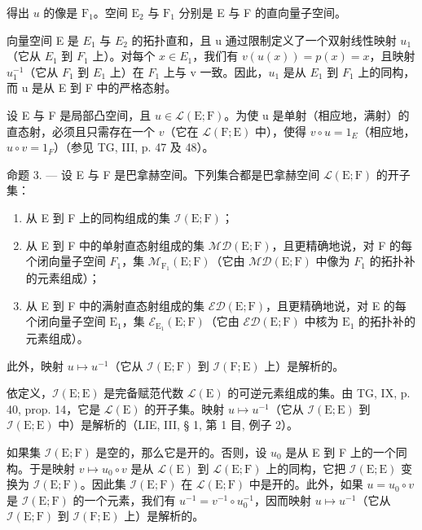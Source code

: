 得出 \(u\) 的像是 \(\mathrm{F}_{1}\)。空间 \(\mathrm{E}_{2}\) 与 \(\mathrm{F}_{1}\) 分别是 E 与 F 的直向量子空间。

向量空间 E 是 \(E_{1}\) 与 \(E_{2}\) 的拓扑直和，且 u 通过限制定义了一个双射线性映射 \(u_{1}\)（它从 \(E_{1}\) 到 \(F_{1}\) 上）。对每个 \(x \in E_{1}\)，我们有 \(v(u(x)) = p(x) = x\)，且映射 \(u_{1}^{-1}\)（它从 \(F_{1}\) 到 \(E_{1}\) 上）在 \(F_{1}\) 上与 v 一致。因此，\(u_{1}\) 是从 \(E_{1}\) 到 \(F_{1}\) 上的同构，而 u 是从 E 到 F 中的严格态射。

设 E 与 F 是局部凸空间，且 \(u \in \mathcal{L}(\mathrm{E};\mathrm{F})\)。为使 u 是单射（相应地，满射）的直态射，必须且只需存在一个 \(v\)（它在 \(\mathcal{L}(\mathrm{F};\mathrm{E})\) 中），使得 \(v \circ u = 1_{E}\)（相应地，\(u \circ v = 1_{F}\)）（参见 TG, III, p. 47 及 48）。

命题 3. --- 设 E 与 F 是巴拿赫空间。下列集合都是巴拿赫空间 \(\mathcal{L}(\mathrm{E};\mathrm{F})\) 的开子集：

\begin{enumerate}
\def\labelenumi{\alph{enumi})}
\item
  从 E 到 F 上的同构组成的集 \(\mathcal{I}(\mathrm{E};\mathrm{F})\)；
\item
   从 E 到 F 中的单射直态射组成的集 \(\mathcal{M}\mathcal{D}(\mathrm{E};\mathrm{F})\)，且更精确地说，对 F 的每个闭向量子空间 \(F_{1}\)，集 \(\mathcal{M}_{\mathrm{F}_{1}}(\mathrm{E};\mathrm{F})\)（它由 \(\mathcal{M}\mathcal{D}(\mathrm{E};\mathrm{F})\) 中像为 \(F_{1}\) 的拓扑补的元素组成）；
\item
   从 E 到 F 中的满射直态射组成的集 \(\mathcal{E}\mathcal{D}(\mathrm{E};\mathrm{F})\)，且更精确地说，对 E 的每个闭向量子空间 \(\mathrm{E}_1\)，集 \(\mathcal{E}_{\mathrm{E}_1}(\mathrm{E};\mathrm{F})\)（它由 \(\mathcal{E}\mathcal{D}(\mathrm{E};\mathrm{F})\) 中核为 \(\mathrm{E}_1\) 的拓扑补的元素组成）。
\end{enumerate}

此外，映射 \(u \mapsto u^{-1}\)（它从 \(\mathcal{I}(\mathrm{E};\mathrm{F})\) 到 \(\mathcal{I}(\mathrm{F};\mathrm{E})\) 上）是解析的。

依定义，\(\mathcal{I}(\mathrm{E};\mathrm{E})\) 是完备赋范代数 \(\mathcal{L}(\mathrm{E})\) 的可逆元素组成的集。由 TG, IX, p. 40, prop. 14，它是 \(\mathcal{L}(\mathrm{E})\) 的开子集。映射 \(u\mapsto u^{-1}\)（它从 \(\mathcal{I}(\mathrm{E};\mathrm{E})\) 到 \(\mathcal{I}(\mathrm{E};\mathrm{E})\) 中）是解析的（LIE, III, § 1, 第 1 目, 例子 2）。

如果集 \(\mathcal{I}(\mathrm{E};\mathrm{F})\) 是空的，那么它是开的。否则，设 \(u_0\) 是从 E 到 F 上的一个同构。于是映射 \(v\mapsto u_0\circ v\) 是从 \(\mathcal{L}(\mathrm{E})\) 到 \(\mathcal{L}(\mathrm{E};\mathrm{F})\) 上的同构，它把 \(\mathcal{I}(\mathrm{E};\mathrm{E})\) 变换为 \(\mathcal{I}(\mathrm{E};\mathrm{F})\)。因此集 \(\mathcal{I}(\mathrm{E};\mathrm{F})\) 在 \(\mathcal{L}(\mathrm{E};\mathrm{F})\) 中是开的。此外，如果 \(u = u_0\circ v\) 是 \(\mathcal{I}(\mathrm{E};\mathrm{F})\) 的一个元素，我们有 \(u^{-1} = v^{-1}\circ u_0^{-1}\)，因而映射 \(u\mapsto u^{-1}\)（它从 \(\mathcal{I}(\mathrm{E};\mathrm{F})\) 到 \(\mathcal{I}(\mathrm{F};\mathrm{E})\) 上）是解析的。

